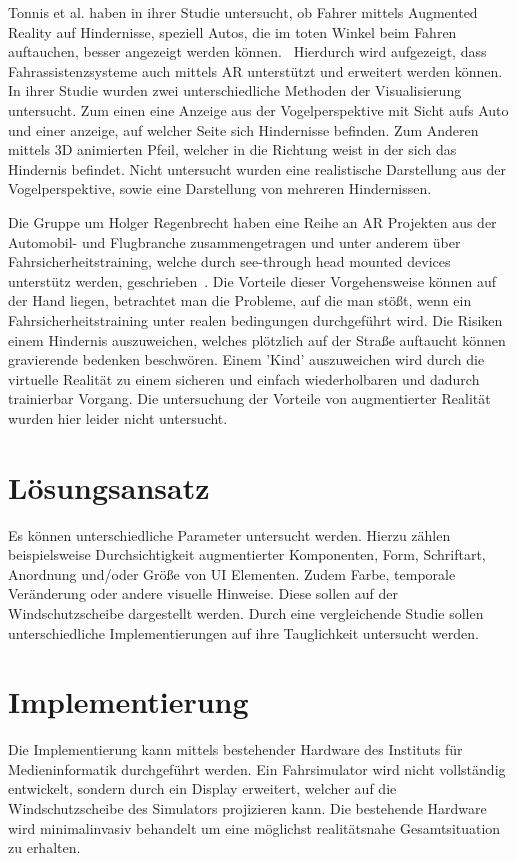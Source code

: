 \documentclass[a4paper, 11pt]{article}
\begin{document}
Tonnis et al. haben in ihrer Studie untersucht, ob Fahrer mittels Augmented Reality auf Hindernisse, speziell Autos, die im toten Winkel beim Fahren auftauchen, besser angezeigt werden können.~\cite{tonnis2005attention} Hierdurch wird aufgezeigt, dass Fahrassistenzsysteme auch mittels AR unterstützt und erweitert werden können. In ihrer Studie wurden zwei unterschiedliche Methoden der Visualisierung untersucht. Zum einen eine Anzeige aus der Vogelperspektive mit Sicht aufs Auto und einer anzeige, auf welcher Seite sich Hindernisse befinden. Zum Anderen mittels 3D animierten Pfeil, welcher in die Richtung weist in der sich das Hindernis befindet. Nicht untersucht wurden eine realistische Darstellung aus der Vogelperspektive, sowie eine Darstellung von mehreren Hindernissen. 

Die Gruppe um Holger Regenbrecht haben eine Reihe an AR Projekten aus der Automobil- und Flugbranche zusammengetragen und unter anderem über Fahrsicherheitstraining, welche durch see-through head mounted devices unterstütz werden, geschrieben~\cite{regenbrecht2005projects}. Die Vorteile dieser Vorgehensweise können auf der Hand liegen, betrachtet man die Probleme, auf die man stößt, wenn ein Fahrsicherheitstraining unter realen bedingungen durchgeführt wird. Die Risiken einem Hindernis auszuweichen, welches plötzlich auf der Straße auftaucht können gravierende bedenken beschwören. Einem 'Kind' auszuweichen wird durch die virtuelle Realität zu einem sicheren und einfach wiederholbaren und dadurch trainierbar Vorgang. Die untersuchung der Vorteile von augmentierter Realität wurden hier leider nicht untersucht. 

\section*{Lösungsansatz}
Es können unterschiedliche Parameter untersucht werden. Hierzu zählen beispielsweise Durchsichtigkeit augmentierter Komponenten, Form, Schriftart,  Anordnung und/oder Größe von UI Elementen. Zudem Farbe, temporale Veränderung oder andere visuelle Hinweise. Diese sollen auf der Windschutzscheibe dargestellt werden. Durch eine vergleichende Studie sollen unterschiedliche Implementierungen auf ihre Tauglichkeit untersucht werden. 

\section*{Implementierung}
Die Implementierung kann mittels bestehender Hardware des Instituts für Medieninformatik durchgeführt werden. Ein Fahrsimulator wird nicht vollständig entwickelt, sondern durch ein Display erweitert, welcher auf die Windschutzscheibe des Simulators projizieren kann. Die bestehende Hardware wird minimalinvasiv behandelt um eine möglichst realitätsnahe Gesamtsituation zu erhalten. 
\end{document}
